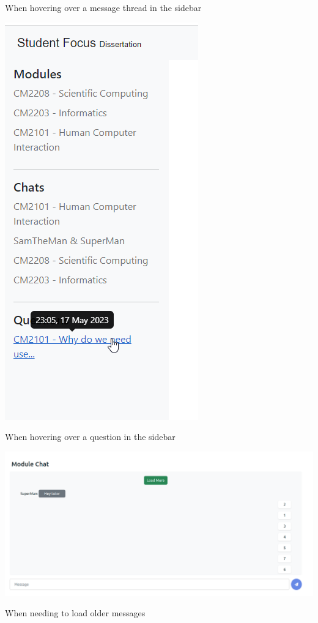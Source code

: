 When hovering over a message thread in the sidebar

\includegraphics[scale=0.50]{images/application/62 - aside_question_hover.png}

When hovering over a question in the sidebar

\includegraphics[scale=0.27]{images/application/63 - load_more_messages.png}

When needing to load older messages

